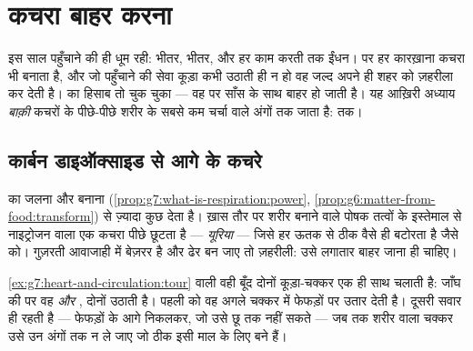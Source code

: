 \chapter{कचरा बाहर करना}\label{ch:g7:removing-wastes}

इस साल पहुँचाने की ही धूम रही:  भीतर,  भीतर, और हर काम
करती  तक ईंधन। पर हर कारख़ाना कचरा भी बनाता है, और जो पहुँचाने की
सेवा कूड़ा कभी उठाती ही न हो वह जल्द अपने ही शहर को ज़हरीला कर देती है।
 का हिसाब तो चुक चुका --- वह  पर साँस के साथ
बाहर हो जाती है। यह आख़िरी अध्याय \emph{बाक़ी} कचरों के पीछे-पीछे शरीर
के सबसे कम चर्चा वाले अंगों तक जाता है:  तक।

\section{कार्बन डाइऑक्साइड से आगे के कचरे}

\begin{proposition}[कोशिकाओं का बाक़ी कूड़ा]\label{prop:g7:removing-wastes:rubbish}
 का जलना और बनाना
(\cref{prop:g7:what-is-respiration:power},
\cref{prop:g6:matter-from-food:transform})  से
ज़्यादा कुछ देता है। ख़ास तौर पर शरीर बनाने वाले पोषक तत्वों के
इस्तेमाल से नाइट्रोजन वाला एक कचरा पीछे छूटता है ---
\emph{यूरिया} --- जिसे  हर ऊतक से ठीक वैसे ही बटोरता
है जैसे  को।  गुज़रती आवाजाही में बेज़रर है और
ढेर बन जाए तो ज़हरीली: उसे लगातार बाहर जाना ही चाहिए।
\end{proposition}
\admitted

\begin{example}[दो कूड़ा-चक्कर, रक्त एक]\label{ex:g7:removing-wastes:rounds}
\cref{ex:g7:heart-and-circulation:tour} वाली वही बूँद दोनों कूड़ा-चक्कर
एक ही साथ चलाती है: जाँघ की  पर वह 
\emph{और} , दोनों उठाती है। पहली को वह अगले चक्कर में फेफड़ों पर
उतार देती है। दूसरी सवार ही रहती है --- फेफड़ों के आगे निकलकर, जो उसे
छू तक नहीं सकते --- जब तक शरीर वाला चक्कर उसे उन अंगों तक न ले जाए जो
ठीक इसी माल के लिए बने हैं।
\end{example}

